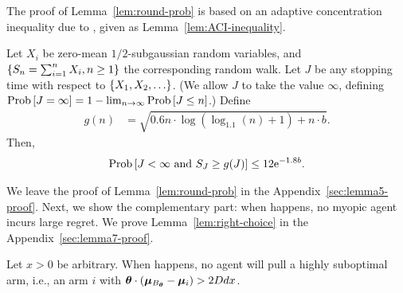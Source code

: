 The proof of Lemma~\ref{lem:round-prob} is based on an adaptive
concentration inequality due to \cite{zhao2016adaptive},
given as Lemma~\ref{lem:ACI-inequality}.

\begin{lemma}
\label{lem:ACI-inequality}
Let $X_i$ be zero-mean $1/2$-subgaussian random variables,
and $\{ S_n = \sum_{i=1}^n X_i, n \geq 1 \}$ the corresponding random walk.
Let $J$ be any stopping time with respect to $\{ X_1, X_2, \ldots \}$.
(We allow $J$ to take the value $\infty$,
defining $\Prob{J = \infty} = 1 - \lim_{n \to \infty} \Prob{J \leq n}$.)
Define 
\begin{align*}
g(n) & = \sqrt{0.6 n \cdot \log (\log_{1.1}(n) + 1) + n \cdot b}.
\end{align*}
Then, 
\begin{align*}
\Prob{J < \infty \mbox{ and } S_J \geq g(J)} \leq 12 \e^{-1.8 b}.
\end{align*}
\end{lemma}

We leave the proof of Lemma~\ref{lem:round-prob} in the Appendix~\ref{sec:lemma5-proof}. Next, we show the complementary part:
when  happens, no myopic agent incurs large regret. We prove Lemma~\ref{lem:right-choice} in the Appendix~\ref{sec:lemma7-proof}.

\begin{lemma} \label{lem:right-choice}
Let $x > 0$ be arbitrary.
When  happens,
no agent \AgV will pull a highly suboptimal arm, i.e., an arm $i$ with 
$\bm{\theta} \cdot (\bm{\mu}_{B_{\bm{\theta}}} - \bm{\mu}_{i}) > 2D d x$.
\end{lemma}


